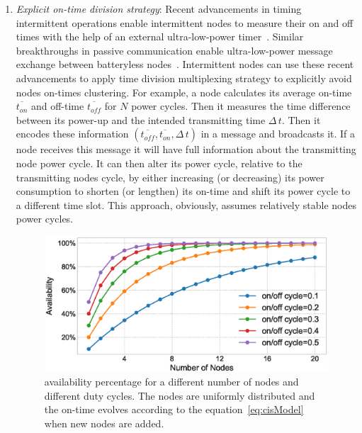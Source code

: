 \begin{enumerate}[label=\roman*.]%
%
		\item \textit{Explicit on-time division strategy}: Recent advancements in timing intermittent operations enable intermittent nodes to measure their on and off times with the help of an external ultra-low-power timer~\cite{mayfly2017hester}. Similar breakthroughs in passive communication enable ultra-low-power message exchange between batteryless nodes~\cite{marco}. Intermittent nodes can use these recent advancements to apply time division multiplexing strategy to explicitly avoid nodes on-times clustering. For example, a node calculates its average on-time $\overline{t_{on}}$ and off-time $\overline{t_{off}}$ for $N$ power cycles. Then it measures the time difference between its power-up and the intended transmitting time $\Delta\,t$. Then it encodes these information $({\overline{t_{off}}, \overline{t_{on}}, \Delta\,t})$ in a message and broadcasts it. If a node receives this message it will have full information about the transmitting node power cycle. It can then alter its power cycle, relative to the transmitting nodes cycle, by either increasing (or decreasing) its power consumption to shorten (or lengthen) its on-time and shift its power cycle to a different time slot. This approach, obviously, assumes relatively stable nodes power cycles. 
%
\begin{figure}
		\centering
		\includegraphics[width=\columnwidth]{figures/cisModel}
		\caption{\fullsys availability percentage for a different number of nodes and different duty cycles. The nodes are uniformly distributed and the \sys on-time evolves according to the equation~\ref{eq:cisModel} when new nodes are added.}
		\label{fig:cisModel}
\end{figure} 
%

\end{enumerate}
